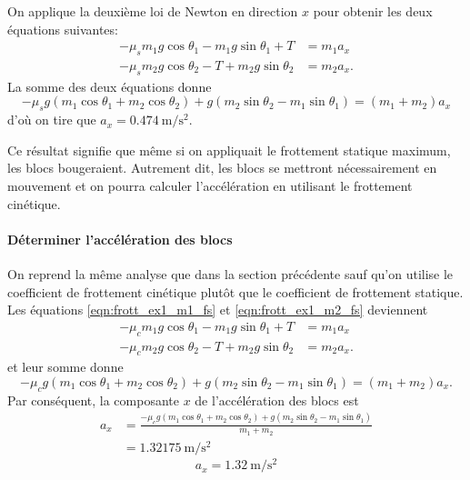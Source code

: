 On applique la deuxième loi de Newton en direction $x$ pour obtenir les deux
équations suivantes:
\begin{align}
  -\mu_s m_1 g\cos\theta_1 - m_1g\sin\theta_1 + T &= m_1a_x \label{eqn:frott_ex1_m1_fs} \\
  -\mu_s m_2 g\cos\theta_2 - T + m_2g\sin\theta_2 &= m_2 a_x.  \label{eqn:frott_ex1_m2_fs}
\end{align}
La somme des deux équations donne
\begin{equation}
  -\mu_s g (m_1 \cos\theta_1 + m_2\cos\theta_2) + g (m_2 \sin\theta_2 -
  m_1\sin\theta_1) = (m_1 + m_2)a_x  \label{eqn:frott_ex1_acc_fs}
\end{equation}
d'où on tire que $a_x = \SI{0.474}{\meter\per\second\squared}$.

Ce résultat signifie que même si on appliquait le frottement statique maximum,
les blocs bougeraient.  Autrement dit, les blocs se mettront nécessairement en
mouvement et on pourra calculer l'accélération en utilisant le frottement
cinétique.


\paragraph{Déterminer l'accélération des blocs}

On reprend la même analyse que dans la section précédente sauf qu'on utilise le
coefficient de frottement cinétique plutôt que le coefficient de frottement
statique.  Les équations \ref{eqn:frott_ex1_m1_fs} et \ref{eqn:frott_ex1_m2_fs}
deviennent
\begin{align}
  -\mu_c m_1 g\cos\theta_1 - m_1g\sin\theta_1 + T &= m_1a_x \label{eqn:frott_ex1_m1_fc} \\
  -\mu_c m_2 g\cos\theta_2 - T + m_2g\sin\theta_2 &= m_2 a_x.  \label{eqn:frott_ex1_m2_fc}
\end{align}
et leur somme donne
\begin{equation}
  -\mu_c g (m_1 \cos\theta_1 + m_2\cos\theta_2) + g (m_2 \sin\theta_2 -
  m_1\sin\theta_1) = (m_1 + m_2)a_x.  \label{eqn:frott_ex1_acc_fc}
\end{equation}
Par conséquent, la composante $x$ de l'accélération des blocs est 
\begin{align*}
  a_x &= \frac{-\mu_c g (m_1 \cos\theta_1 + m_2\cos\theta_2) + g (m_2 \sin\theta_2 -
  m_1\sin\theta_1)}{m_1 + m_2} \\
    &= \SI{1.32175}{\meter\per\second\squared}
\end{align*}
\[
  \boxed{a_x = \SI{1.32}{\meter\per\second\squared}}
\]


